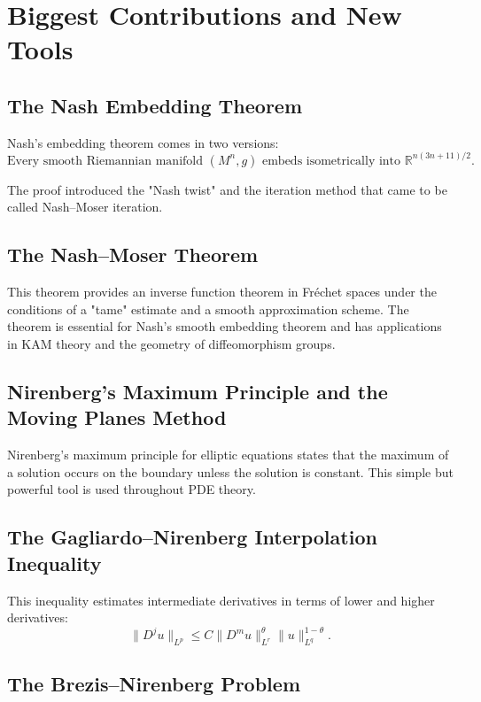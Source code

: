 \section{Biggest Contributions and New Tools}

\subsection{The Nash Embedding Theorem}

Nash's embedding theorem comes in two versions:
\[
\text{Every smooth Riemannian manifold } (M^n, g) \text{ embeds isometrically into } \mathbb{R}^{n(3n+11)/2}.
\]

The proof introduced the "Nash twist" and the iteration method that came to be called Nash--Moser iteration.

\subsection{The Nash--Moser Theorem}

This theorem provides an inverse function theorem in Fr\'echet spaces under the conditions of a "tame" estimate and a smooth approximation scheme. The theorem is essential for Nash's smooth embedding theorem and has applications in KAM theory and the geometry of diffeomorphism groups.

\subsection{Nirenberg's Maximum Principle and the Moving Planes Method}

Nirenberg's maximum principle for elliptic equations states that the maximum of a solution occurs on the boundary unless the solution is constant. This simple but powerful tool is used throughout PDE theory.

\subsection{The Gagliardo--Nirenberg Interpolation Inequality}

This inequality estimates intermediate derivatives in terms of lower and higher derivatives:
\[
\|D^j u\|_{L^p} \leq C \|D^m u\|_{L^r}^\theta \|u\|_{L^q}^{1-\theta}.
\]

\subsection{The Brezis--Nirenberg Problem}

